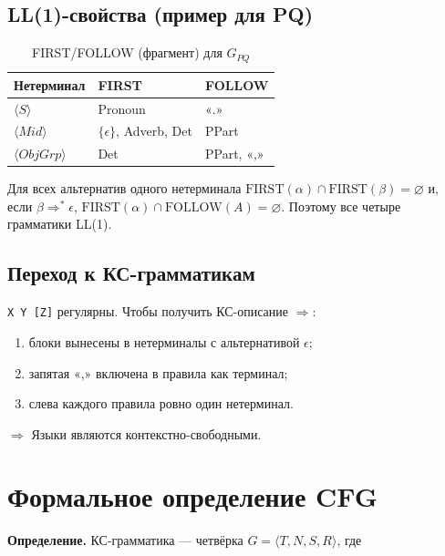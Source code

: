 \documentclass[areasetadvanced]{scrartcl}
\begin{document}
\bigskip
\subsection{LL(1)-свойства (пример для PQ)}
\label{sec:ll-analysis}

\begin{table}[H]
\centering
\caption{{\small FIRST}/{\small FOLLOW} (фрагмент) для $G_{PQ}$}
\begin{tabular}{lll}
  \toprule
  Нетерминал & {\small FIRST} & {\small FOLLOW}\\\midrule
  $\langle S\rangle$        & Pronoun                       & «.»\\
  $\langle Mid\rangle$      & $\{\epsilon\}$, Adverb, Det   & PPart\\
  $\langle ObjGrp\rangle$   & Det                           & PPart, «,»\\\bottomrule
  \end{tabular}  
\end{table}

Для всех альтернатив одного нетерминала  
$\text{FIRST}(\alpha)\cap\text{FIRST}(\beta)=\varnothing$ и,
если $\beta\Rightarrow^{*}\epsilon$,
$\text{FIRST}(\alpha)\cap\text{FOLLOW}(A)=\varnothing$.
Поэтому все четыре грамматики LL(1).
\bigskip
\newpage
\subsection{Переход к КС-грамматикам}

\texttt{X Y [Z]} регулярны.
Чтобы получить КС-описание $\Rightarrow$:

\begin{enumerate}
  \item блоки вынесены в нетерминалы с альтернативой
        $\epsilon$;
  \item запятая «,» включена в правила как терминал;
  \item слева каждого правила ровно один нетерминал.
\end{enumerate}
$\Rightarrow$ Языки являются контекстно-свободными.

\newpage
\section{Формальное определение CFG}
\label{sec:def-cfg}
\textbf{Определение.}\;
КС-грамматика — четвёрка $G=\langle T,N,S,R\rangle$, где  
\end{document}
